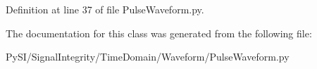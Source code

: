 Definition at line 37 of file Pulse\+Waveform.\+py.



The documentation for this class was generated from the following file\+:\begin{DoxyCompactItemize}
\item 
Py\+S\+I/\+Signal\+Integrity/\+Time\+Domain/\+Waveform/Pulse\+Waveform.\+py\end{DoxyCompactItemize}
